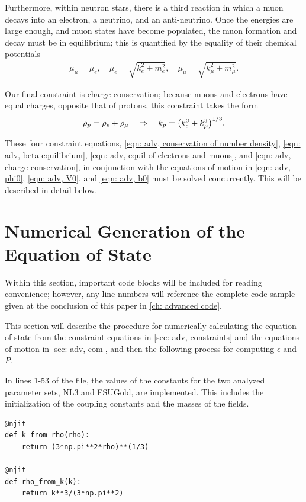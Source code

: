 Furthermore, within neutron stars, there is a third reaction in which a muon decays into an electron, a neutrino, and an anti-neutrino. Once the energies are large enough, and muon states have become populated, the muon formation and decay must be in equilibrium; this is quantified by the equality of their chemical potentials
\begin{align}\label{eqn: adv, equil of electrons and muons}
    \mu_\mu = \mu_e,\quad \mu_e  = \sqrt{k_e^2 + m_e^2}, \quad \mu_\mu  = \sqrt{k_\mu^2 + m_\mu^2}.
\end{align}

Our final constraint is charge conservation; because muons and electrons have equal charges, opposite that of protons, this constraint takes the form
\begin{align}\label{eqn: adv, charge conservation}
    \rho_p = \rho_e + \rho_\mu \goesto k_p = \pqty{k_e^3 + k_\mu^3}^{1/3}.
\end{align}

These four constraint equations, \eqref{eqn: adv, conservation of number density}, \eqref{eqn: adv, beta equilibrium}, \eqref{eqn: adv, equil of electrons and muons}, and \eqref{eqn: adv, charge conservation}, in conjunction with the equations of motion in \eqref{eqn: adv, phi0}, \eqref{eqn: adv, V0}, and \eqref{eqn: adv, b0} must be solved concurrently. This will be described in detail below.

\section{Numerical Generation of the Equation of State}\label{sec: adv, gen}

Within this section, important code blocks will be included for reading convenience; however, any line numbers will reference the complete code sample given at the conclusion of this paper in \autoref{ch: advanced code}.

This section will describe the procedure for numerically calculating the equation of state from the constraint equations in \autoref{sec: adv, constraints} and the equations of motion in \autoref{sec: adv, eom}, and then the following process for computing $\epsilon$ and $P$.

In lines 1-53 of the file, the values of the constants for the two analyzed parameter sets, NL3 and FSUGold, are implemented. This includes the initialization of the coupling constants and the masses of the fields. 

\begin{lstlisting}
@njit
def k_from_rho(rho):
    return (3*np.pi**2*rho)**(1/3)

@njit
def rho_from_k(k):
    return k**3/(3*np.pi**2)
\end{lstlisting}

